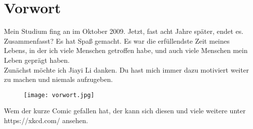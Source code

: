 \chapter*{Vorwort}

Mein Studium fing an im Oktober 2009. Jetzt, fast acht Jahre später, endet es. Zusammenfasst? Es hat Spaß gemacht. Es war die erfüllendste Zeit meines Lebens, in der ich viele Menschen getroffen habe, und auch viele Menschen mein Leben geprägt haben.\\
Zunächst möchte ich Jiayi Li danken. Du hast mich immer dazu motiviert weiter zu machen und niemals aufzugeben. 


\begin{figure}[H]
	\begin{center}
		\texttt{[image: vorwort.jpg]}
	\end{center}
\end{figure}




Wem der kurze Comic gefallen hat, der kann sich diesen und viele weitere unter https://xkcd.com/ ansehen.